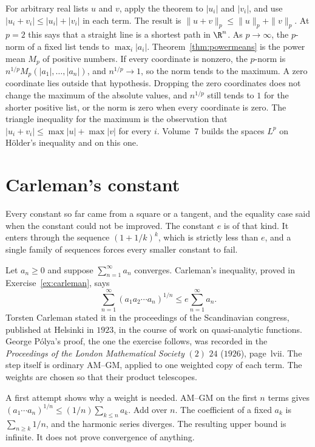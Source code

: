 For arbitrary real lists $u$ and $v$, apply the theorem to $|u_i|$ and $|v_i|$, and use $|u_i+v_i|\le|u_i|+|v_i|$ in each term. The result is $\|u+v\|_p\le\|u\|_p+\|v\|_p$. At $p=2$ this says that a straight line is a shortest path in $\R^n$. As $p\to\infty$, the $p$-norm of a fixed list tends to $\max_i|a_i|$. Theorem~\ref{thm:powermeans} is the power mean $M_p$ of positive numbers. If every coordinate is nonzero, the $p$-norm is $n^{1/p}M_p(|a_1|,\dots,|a_n|)$, and $n^{1/p}\to1$, so the norm tends to the maximum. A zero coordinate lies outside that hypothesis. Dropping the zero coordinates does not change the maximum of the absolute values, and $n^{1/p}$ still tends to $1$ for the shorter positive list, or the norm is zero when every coordinate is zero. The triangle inequality for the maximum is the observation that $|u_i+v_i|\le\max|u|+\max|v|$ for every $i$. Volume~7 builds the spaces $L^p$ on H\"older's inequality and on this one.

\section{Carleman's constant}\label{sec:carleman}

Every constant so far came from a square or a tangent, and the equality case said when the constant could not be improved. The constant $e$ is of that kind. It enters through the sequence $(1+1/k)^k$, which is strictly less than $e$, and a single family of sequences forces every smaller constant to fail.

Let $a_n\ge0$ and suppose $\sum_{n=1}^\infty a_n$ converges. Carleman's inequality, proved in Exercise~\ref{ex:carleman}, says
\[
\sum_{n=1}^\infty(a_1a_2\cdots a_n)^{1/n}\le e\sum_{n=1}^\infty a_n.
\]
Torsten Carleman stated it in the proceedings of the Scandinavian congress, published at Helsinki in $1923$, in the course of work on quasi-analytic functions. George P\'olya's proof, the one the exercise follows, was recorded in the \emph{Proceedings of the London Mathematical Society} $(2)$ $24$ ($1926$), page~lvii. The step itself is ordinary AM--GM, applied to one weighted copy of each term. The weights are chosen so that their product telescopes.

A first attempt shows why a weight is needed. AM--GM on the first $n$ terms gives $(a_1\cdots a_n)^{1/n}\le(1/n)\sum_{k\le n}a_k$. Add over $n$. The coefficient of a fixed $a_k$ is $\sum_{n\ge k}1/n$, and the harmonic series diverges. The resulting upper bound is infinite. It does not prove convergence of anything.

